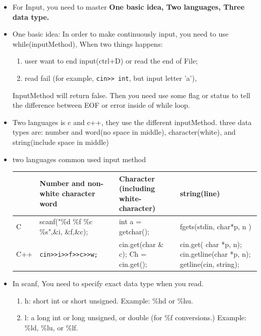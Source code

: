 \documentclass[a4paper,11pt,twoside]{book}
\newcommand{\tophline}{\hline }
\newcommand{\bottomhline}{\\ \hline }
\newcommand{\tophline}{ }
\newcommand{\bottomhline}{ }
\begin{document}
\begin{itemize}
	\item For Input, you need to master \textbf{One basic idea, Two languages, Three data type.}
	\item One basic idea: In order to make continuously input, you need to use while(inputMethod), When two things happens:
	\begin{enumerate}
		\item user want to end input(ctrl+D) or read the end of File;
		\item read fail (for example,  \verb|cin>> int|, but input letter 'a'),
	\end{enumerate}
	
	InputMethod will return false.  Then you need use some flag or status to tell the difference between EOF or error inside of while loop.
	
	\item Two languages is c and c++, they use the different inputMethod. three data types are: number and word(no space in middle), character(white), and string(include space in middle)
	
	\item two languages common used input method \\
	\begin{tabular}{|p{}|p{}|p{}|p{}|}
		\tophline
		& Number and non-white  character word & Character (including white-character) & string(line)\\
		\tophline
		C &scanf("\%d \%f \%c \%s",\&i, \&f,\&c);  & int a = getchar(); & fgets(stdin, char*p, n ) \\
		\tophline
		C++ & \verb|cin>>i>>f>>c>>w;| & cin.get(char \& c); \newline  Ch = cin.get(); & cin.get( char *p, n); \newline cin.getline(char *p, n); \newline getline(cin, string);
		\bottomhline
	\end{tabular}
	
	
	\item In scanf, You need to specify exact data type when you read.
	\begin{enumerate}
		\item h:  short int or short unsigned. Example: \%hd or \%hu.
		
		\item l:  a long int or long unsigned, or double (for \%f conversions.) Example: \%ld, \%lu, or \%lf.
		

\end{enumerate}
\end{itemize}
\end{document}
